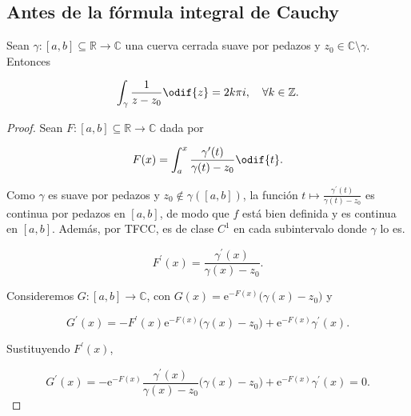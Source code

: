 \documentclass[../main.tex]{subfiles}
\begin{document}
\subsection{Antes de la fórmula integral de Cauchy}

\begin{lemma}
    Sean \(\gamma \colon [a, b] \subseteq \mathbb{R} \to \mathbb{C}\) una cuerva cerrada
    suave por pedazos y \(z_{0} \in \mathbb{C}\setminus \gamma\). Entonces

    \begin{equation*}
        \int_{\gamma}^{}\dfrac{1}{z - z_{0}}\odif{z} = 2k\pi i,\quad \forall
        k\in \mathbb{Z}.
    \end{equation*}
\end{lemma}

\begin{proof}
    Sean \(F \colon [a, b] \subseteq \mathbb{R} \to \mathbb{C}\) dada por

    \begin{equation*}
        F(x) = \int_{a}^{x}\dfrac{\gamma^{\prime}(t)}{\gamma(t) - z_{0}}\odif{t}.
    \end{equation*}

    Como \(\gamma\) es suave por pedazos y \(z_{0}\notin \gamma([a, b])\), la
    función \(t
    \mapsto \tfrac{\gamma^{\prime}(t)}{\gamma(t) - z_{0}}\) es continua por
    pedazos en \([a,
    b]\), de modo que \(f\) está bien definida y es continua en \([a, b]\). Además, por
    TFCC, es de clase \(C^{1}\) en cada subintervalo donde \(\gamma\) lo es.

    \begin{equation*}
        F^{\prime}(x) = \dfrac{\gamma^{\prime}(x)}{\gamma(x) - z_{0}}.
    \end{equation*}

    Consideremos \(G \colon [a, b] \to \mathbb{C}\), con \(G(x) =
    \mathrm{e}^{-F(x)}\bigl(\gamma(x) - z_{0}\bigr)\) y

    \begin{equation*}
        G^{\prime}(x) = -F^{\prime}(x)\mathrm{e}^{-F(x)}\bigl(\gamma(x) - z_{0}\bigr) +
        \mathrm{e}^{-F(x)}\gamma^{\prime}(x).
    \end{equation*}

    Sustituyendo \(F^{\prime}(x)\),

    \begin{equation*}
        G^{\prime}(x) = -\mathrm{e}^{-F(x)}\dfrac{\gamma^{\prime}(x)}{\gamma(x) -
        z_{0}}\bigl(\gamma(x) - z_{0}\bigr) + \mathrm{e}^{-F(x)}\gamma^{\prime}(x) = 0.
    \end{equation*}


\end{proof}
\end{document}
